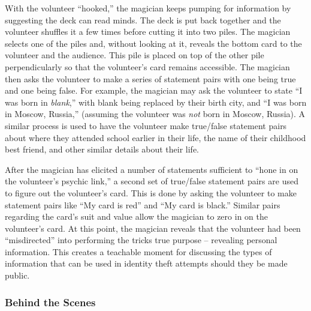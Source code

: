 With the volunteer ``hooked,'' the magician keeps pumping for information by
suggesting the deck can read minds.
The deck is put back together
and the volunteer shuffles it
a few times before cutting it into two piles.
The magician
selects one of the piles and, without looking at it,
reveals the bottom card to the volunteer and the
audience.
This pile is placed on top of the other pile perpendicularly so that
the volunteer's card remains accessible.  The magician then asks the volunteer to
make a series of statement pairs with one being true and one being false.  For
example,  the magician may ask the volunteer to state  ``I was born in
\textit{blank},'' with blank being replaced by their birth city, and ``I was
born in Moscow, Russia,'' (assuming the volunteer was \textit{not} born in Moscow,
Russia).  A similar process is used to have the volunteer make true/false
statement pairs about where they attended school earlier in their life, the name
of their childhood best friend, and other similar details about their life.

After the magician has elicited a number of statements sufficient to
``hone in on the volunteer's psychic link,''
a second set of true/false statement pairs are used
to figure out the volunteer's card.  This is done by asking the volunteer to make
statement pairs like ``My card is red'' and ``My card is black.''  Similar
pairs regarding the card's suit and value allow the magician to zero
in on the volunteer's card.
At this point, the magician reveals that the volunteer had been
``misdirected'' into performing the tricks true purpose -- revealing
personal information.  This creates a teachable moment for discussing
the types of information that can be used in identity theft attempts
should they
be made public.


\subsubsection{Behind the Scenes}

